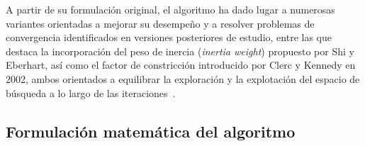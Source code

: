 A partir de su formulación original, el algoritmo ha dado lugar a numerosas variantes orientadas a mejorar su desempeño y a resolver problemas de convergencia identificados en versiones posteriores de estudio, entre las que destaca la incorporación del peso de inercia (\textit{inertia weight}) propuesto por Shi y Eberhart, así como el factor de constricción introducido por Clerc y Kennedy en 2002, ambos orientados a equilibrar la exploración y la explotación del espacio de búsqueda a lo largo de las iteraciones~\cite{freitas_particle_2020}.

\subsection{Formulación matemática del algoritmo}

